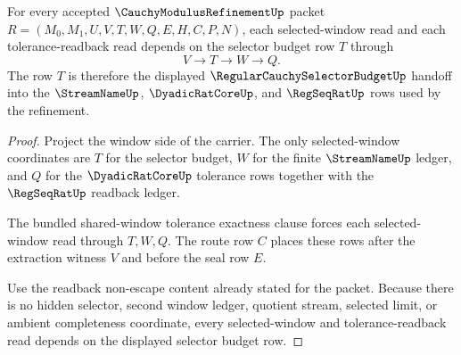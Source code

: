 \begin{theorem}
\label{thm:cauchy-modulus-refinement-selector-budget-dependency}
For every accepted $\CauchyModulusRefinementUp$ packet $R=(M_0,M_1,U,V,T,W,Q,E,H,C,P,N)$, each selected-window read and each tolerance-readback read depends on the selector budget row $T$ through
$$
V \longrightarrow T \longrightarrow W \longrightarrow Q.
$$
The row $T$ is therefore the displayed $\RegularCauchySelectorBudgetUp$ handoff into the $\StreamNameUp$, $\DyadicRatCoreUp$, and $\RegSeqRatUp$ rows used by the refinement.
\end{theorem}
\begin{proof}
Project the window side of the carrier. The only selected-window coordinates are $T$ for the selector budget, $W$ for the finite $\StreamNameUp$ ledger, and $Q$ for the $\DyadicRatCoreUp$ tolerance rows together with the $\RegSeqRatUp$ readback ledger.

The bundled shared-window tolerance exactness clause forces each selected-window read through $T,W,Q$. The route row $C$ places these rows after the extraction witness $V$ and before the seal row $E$.

Use the readback non-escape content already stated for the packet. Because there is no hidden selector, second window ledger, quotient stream, selected limit, or ambient completeness coordinate, every selected-window and tolerance-readback read depends on the displayed selector budget row.
\end{proof}



